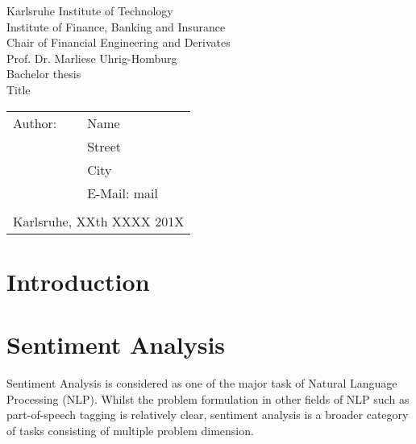\documentclass[a4paper,12pt]{article}%
\begin{document}
\begin{titlepage}
    \begin{center}
        {\Large Karlsruhe Institute of Technology\\[0.4cm]
            Institute of Finance, Banking and Insurance\\[0.3cm]
            Chair of Financial Engineering and Derivates\\[0.3cm]
            Prof. Dr. Marliese Uhrig-Homburg}\\[3.5cm]
        {\large Bachelor thesis}\\[1.5cm]
        {\Huge Title}\\[8cm]
    \end{center}
    \renewcommand{\baselinestretch}{1.2}\small\normalsize
    \begin{tabular}{ll}
        Author:  & Name\\
        & Street\\
        & City\\
        & E-Mail: mail\\\\
        \multicolumn{2}{l}{Karlsruhe, XXth XXXX 201X}
    \end{tabular}
    \vfill
\end{titlepage}

\sloppy

\onehalfspacing

\pagebreak%
\doublespacing %

\setcounter{page}{1}
\tableofcontents
\newpage
\listoffigures
{}
\newpage
\listoftables
{}
\newpage


\setcounter{page}{1}
\section{Introduction}

\section{Sentiment Analysis}
Sentiment Analysis is considered as one of the major task of Natural Language Processing (NLP). Whilst the problem formulation in other fields of NLP such as part-of-speech tagging is relatively clear, sentiment analysis is a broader category of tasks consisting of multiple problem dimension. 
\end{document}
